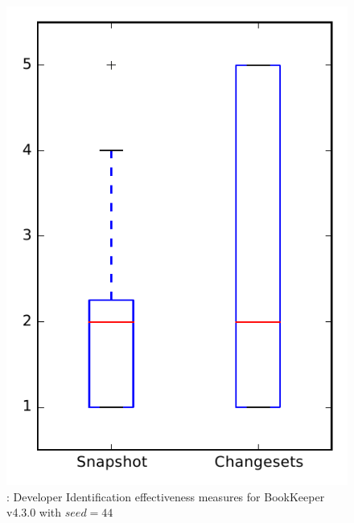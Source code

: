 
\begin{figure}
\centering
\includegraphics[height=0.4\textheight]{figures/dit_seed/rq1_bookkeeper_44}
\caption{\rtwo: Developer Identification effectiveness measures for BookKeeper v4.3.0 with $seed=44$}
\label{fig:dit_seed:rq1:bookkeeper}
\end{figure}
